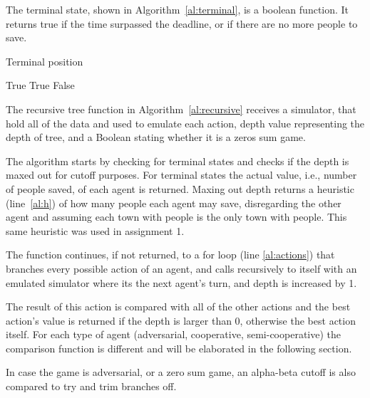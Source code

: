 \documentclass{article}                     %
\begin{document}
	The terminal state, shown in Algorithm~\ref{al:terminal}, is a boolean function. It returns true if the time surpassed the deadline, or if there are no more people to save. 
	

	
	\begin{algorithm}
		\caption{Terminal position}
		\label{al:terminal}		
		\begin{algorithmic}[1]
			\State  \Return True
			\State  \Return True
			\Else
			\State \Return False
			\EndIf
			\EndProcedure
		\end{algorithmic}
	\end{algorithm}
	
	The recursive tree function in Algorithm~\ref{al:recursive} receives a simulator, that hold all of the data and used to emulate each action, depth value representing the depth of tree, and a Boolean stating whether it is a zeros sum game. 
	
	The algorithm starts by checking for terminal states and checks if the depth is maxed out for cutoff purposes. For terminal states the actual value, i.e., number of people saved, of each agent is returned. Maxing out depth returns a heuristic (line~\ref{al:h}) of how many people each agent may save, disregarding the other agent and assuming each town with people is the only town with people.
	This same heuristic was used in assignment 1.
	
	The function continues, if not returned, to a for loop (line \ref{al:actions}) that branches every possible action of an agent, and calls recursively to itself with an emulated simulator where its the next agent's turn, and depth is increased by 1. 
	
	The result of this action is compared with all of the other actions and the best action's value is returned if the depth is larger than 0, otherwise the best action itself.
	For each type of agent (adversarial, cooperative, semi-cooperative) the comparison function is different and will be elaborated in the following section.
	
	In case the game is adversarial, or a zero sum game, an alpha-beta cutoff is also compared to try and trim branches off.
	
\end{document}
